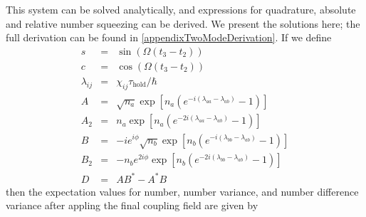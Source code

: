\documentclass{iopart}
\begin{document}
This system can be solved analytically, and expressions for quadrature, absolute and relative number squeezing can be derived. We present the solutions here; the full derivation can be found in \ref{appendixTwoModeDerivation}.
If we define
\begin{eqnarray}
s &=& \sin(\Omega (t_3 - t_2)) \label{eqsDef} \\
c &=& \cos(\Omega (t_3 - t_2)) \\
\lambda_{ij} &=& \chi_{ij} \tau_{\mathrm{hold}} / \hbar \\
A &=& \sqrt{n_a} \exp [n_a (e^{-i(\lambda_{aa}-\lambda_{ab})} - 1 )] \\
A_2 &=& n_a \exp [n_a (e^{-2i(\lambda_{aa}-\lambda_{ab})} - 1 )] \\
B &=& -i e^{i \phi}\sqrt{n_b} \exp [n_b (e^{-i(\lambda_{bb}-\lambda_{ab})} - 1 )] \\
B_2 &=& -n_b e^{2i\phi} \exp [n_b (e^{-2i(\lambda_{bb}-\lambda_{ab})} - 1 )] \\
D &=& AB^* - A^*B \label{eqDDef}
\end{eqnarray}
then the expectation values for number, number variance, and number difference variance after appling the final coupling field are given by
\end{document}
